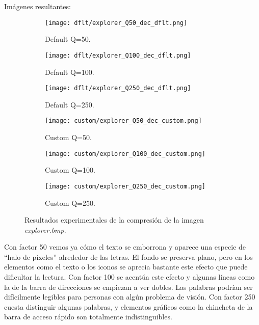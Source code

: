 \documentclass[12pt,a4paper]{article}
\begin{document}
Imágenes resultantes:
\begin{figure}[H]
    
    \begin{subfigure}{0.30\textwidth}
        \centering
        \texttt{[image: dflt/explorer\_Q50\_dec\_dflt.png]}
        \caption{Default Q=50.}
        
    \end{subfigure}
    \hfill
    \begin{subfigure}{0.30\textwidth}
        \centering
        \texttt{[image: dflt/explorer\_Q100\_dec\_dflt.png]}
        \caption{Default Q=100.}
        
    \end{subfigure}
    \hfill
    \begin{subfigure}{0.30\textwidth}
        \centering
        \texttt{[image: dflt/explorer\_Q250\_dec\_dflt.png]}
        \caption{Default Q=250.}
        
    \end{subfigure}
    
    \vspace{0.5cm}
    
    \begin{subfigure}{0.30\textwidth}
        \centering
        \texttt{[image: custom/explorer\_Q50\_dec\_custom.png]}
        \caption{Custom Q=50.}
        
    \end{subfigure}
    \hfill
    \begin{subfigure}{0.30\textwidth}
        \centering
        \texttt{[image: custom/explorer\_Q100\_dec\_custom.png]}
        \caption{Custom Q=100.}
        
    \end{subfigure}
    \hfill
    \begin{subfigure}{0.30\textwidth}
        \centering
        \texttt{[image: custom/explorer\_Q250\_dec\_custom.png]}
        \caption{Custom Q=250.}
        
    \end{subfigure}
    
    \caption[Resultados experimentales - explorer]{Resultados experimentales de la compresión de la imagen \textit{explorer.bmp}.}
    
\end{figure}

Con factor 50 vemos ya cómo el texto se emborrona y aparece una especie de ``halo de píxeles'' alrededor de las letras. El fondo se preserva plano, pero en los elementos como el texto o los iconos se aprecia bastante este efecto que puede dificultar la lectura. Con factor 100 se acentúa este efecto y algunas líneas como la de la barra de direcciones se empiezan a ver dobles. Las palabras podrían ser difícilmente legibles para personas con algún problema de visión. Con factor 250 cuesta distinguir algunas palabras, y elementos gráficos como la chincheta de la barra de acceso rápido son totalmente indistinguibles.\\
\end{document}

